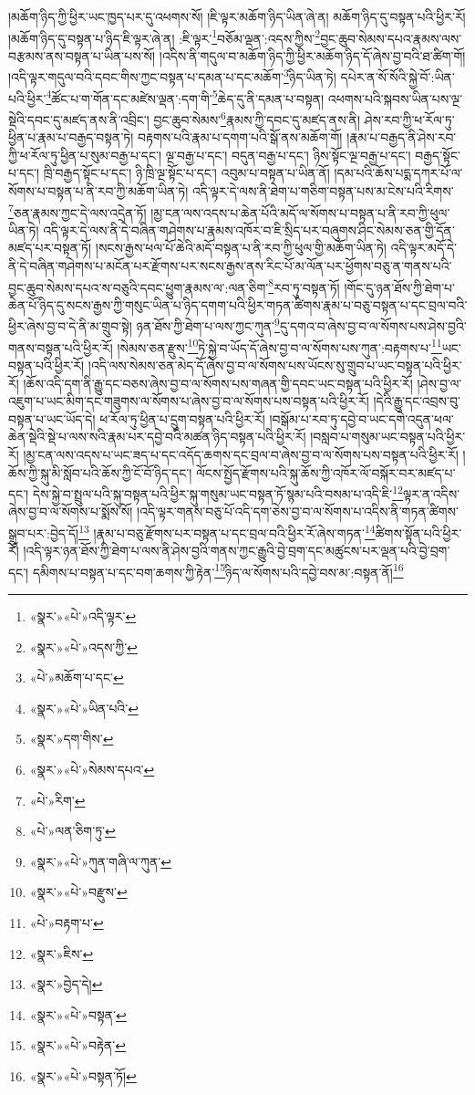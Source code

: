 །མཆོག་ཉིད་ཀྱི་ཕྱིར་ཡང་ཁྱད་པར་དུ་འཕགས་སོ། །ཇི་ལྟར་མཆོག་ཉིད་ཡིན་ཞེ་ན། མཆོག་ཉིད་དུ་བསྟན་པའི་ཕྱིར་རོ། །མཆོག་ཉིད་དུ་བསྟན་པ་ཉིད་ཇི་ལྟར་ཞེ་ན། :ཇི་ལྟར་\footnote{«སྣར་»«པེ་»འདི་ལྟར་}བཅོམ་ལྡན་:འདས་ཀྱིས་\footnote{«སྣར་»«པེ་»འདས་ཀྱི་}བྱང་ཆུབ་སེམས་དཔའ་རྣམས་ལས་བརྩམས་ནས་བསྟན་པ་ཡིན་པས་སོ། །འདིས་ནི་གདུལ་བ་མཆོག་ཉིད་ཀྱི་ཕྱིར་མཆོག་ཉིད་དོ་ཞེས་བྱ་བའི་ཐ་ཚིག་གོ། །འདི་ལྟར་གདུལ་བའི་དབང་གིས་ཀྱང་བསྟན་པ་དམན་པ་དང་མཆོག་\footnote{«པེ་»མཆོག་པ་དང་}ཉིད་ཡིན་ཏེ། དཔེར་ན་སོ་སོའི་སྐྱེ་བོ་:ཡིན་པའི་ཕྱིར་\footnote{«སྣར་»«པེ་»ཡིན་པའི་}ཚོང་པ་ག་གོན་དང་མཛེས་ལྡན་:དག་གི་\footnote{«སྣར་»དག་གིས་}ཆེད་དུ་ནི་དམན་པ་བསྟན། འཕགས་པའི་སྐབས་ཡིན་པས་ལྔ་སྡེའི་དབང་དུ་མཛད་ནས་ནི་འབྲིང་། བྱང་ཆུབ་སེམས་\footnote{«སྣར་»«པེ་»སེམས་དཔའ་}རྣམས་ཀྱི་དབང་དུ་མཛད་ནས་ནི། ཤེས་རབ་ཀྱི་ཕ་རོལ་ཏུ་ཕྱིན་པ་རྣམ་པ་བརྒྱད་བསྟན་ཏེ། བརྟགས་པའི་རྣམ་པ་དགག་པའི་སྒོ་ནས་མཆོག་གོ། །རྣམ་པ་བརྒྱད་ནི་ཤེས་རབ་ཀྱི་ཕ་རོལ་ཏུ་ཕྱིན་པ་སུམ་བརྒྱ་པ་དང་། ལྔ་བརྒྱ་པ་དང་། བདུན་བརྒྱ་པ་དང་། ཉིས་སྟོང་ལྔ་བརྒྱ་པ་དང་། བརྒྱད་སྟོང་པ་དང་། ཁྲི་བརྒྱད་སྟོང་པ་དང་། ཉི་ཁྲི་ལྔ་སྟོང་པ་དང་། འབུམ་པ་བསྟན་པ་ཡིན་ནོ། །དམ་པའི་ཆོས་པདྨ་དཀར་པོ་ལ་སོགས་པ་བསྟན་པ་ནི་རབ་ཀྱི་མཆོག་ཡིན་ཏེ། འདི་ལྟར་དེ་ལས་ནི་ཐེག་པ་གཅིག་བསྟན་པས་མ་ངེས་པའི་རིགས་\footnote{«པེ་»རིག་}ཅན་རྣམས་ཀྱང་དེ་ལས་འདྲེན་ཏོ། །མྱ་ངན་ལས་འདས་པ་ཆེན་པོའི་མདོ་ལ་སོགས་པ་བསྟན་པ་ནི་རབ་ཀྱི་ཕུལ་ཡིན་ཏེ། འདི་ལྟར་དེ་ལས་ནི་དེ་བཞིན་གཤེགས་པ་རྣམས་འཁོར་བ་ཇི་སྲིད་པར་བཞུགས་ཤིང་སེམས་ཅན་གྱི་དོན་མཛད་པར་བསྟན་ཏོ། །སངས་རྒྱས་ཕལ་པོ་ཆེའི་མདོ་བསྟན་པ་ནི་རབ་ཀྱི་ཕུལ་གྱི་མཆོག་ཡིན་ཏེ། འདི་ལྟར་མདོ་དེ་ནི་དེ་བཞིན་གཤེགས་པ་མངོན་པར་རྫོགས་པར་སངས་རྒྱས་ནས་རིང་པོ་མ་ལོན་པར་ཕྱོགས་བཅུ་ན་གནས་པའི་བྱང་ཆུབ་སེམས་དཔའ་ས་བཅུའི་དབང་ཕྱུག་རྣམས་ལ་:ལན་ཅིག་\footnote{«པེ་»ལན་ཅིག་ཏུ་}རབ་ཏུ་བསྟན་ཏོ། །གོང་དུ་ཉན་ཐོས་ཀྱི་ཐེག་པ་ཆེན་པོ་ཉིད་དུ་སངས་རྒྱས་ཀྱི་གསུང་ཡིན་པ་ཉིད་དགག་པའི་ཕྱིར་གཏན་ཚིགས་རྣམ་པ་བཅུ་བསྟན་པ་དང་བྲལ་བའི་ཕྱིར་ཞེས་བྱ་བ་དེ་ནི་མ་གྲུབ་སྟེ། ཉན་ཐོས་ཀྱི་ཐེག་པ་ལས་ཀྱང་ཀུན་\footnote{«སྣར་»«པེ་»ཀུན་གཞི་ལ་ཀུན་}དུ་དགའ་བ་ཞེས་བྱ་བ་ལ་སོགས་པས་ཤེས་བྱའི་གནས་བསྟན་པའི་ཕྱིར་རོ། །སེམས་ཅན་རྫུས་\footnote{«སྣར་»«པེ་»བརྫུས་}ཏེ་སྐྱེ་བ་ཡོད་དོ་ཞེས་བྱ་བ་ལ་སོགས་པས་ཀུན་:བརྟགས་པ་\footnote{«པེ་»བརྟག་པ་}ཡང་བསྟན་པའི་ཕྱིར་རོ། །འདི་ལས་སེམས་ཅན་མེད་དོ་ཞེས་བྱ་བ་ལ་སོགས་པས་ཡོངས་སུ་གྲུབ་པ་ཡང་བསྟན་པའི་ཕྱིར་རོ། །ཆོས་འདི་དག་ནི་རྒྱུ་དང་བཅས་ཞེས་བྱ་བ་ལ་སོགས་པས་གཞན་གྱི་དབང་ཡང་བསྟན་པའི་ཕྱིར་རོ། །ཤེས་བྱ་ལ་འཇུག་པ་ཡང་མིག་དང་གཟུགས་ལ་སོགས་པ་ཞེས་བྱ་བ་ལ་སོགས་པས་བསྟན་པའི་ཕྱིར་རོ། །དེའི་རྒྱུ་དང་འབྲས་བུ་བསྟན་པ་ཡང་ཡོད་དེ། ཕ་རོལ་ཏུ་ཕྱིན་པ་དྲུག་བསྟན་པའི་ཕྱིར་རོ། །བསྒོམ་པ་རབ་ཏུ་དབྱེ་བ་ཡང་དགེ་འདུན་ཕལ་ཆེན་སྡེའི་སྡེ་པ་ལས་སའི་རྣམ་པར་དབྱེ་བའི་མཚན་ཉིད་བསྟན་པའི་ཕྱིར་རོ། །བསླབ་པ་གསུམ་ཡང་བསྟན་པའི་ཕྱིར་རོ། །མྱ་ངན་ལས་འདས་པ་ཡང་ཟད་པ་དང་འདོད་ཆགས་དང་བྲལ་བ་ཞེས་བྱ་བ་ལ་སོགས་པས་བསྟན་པའི་ཕྱིར་རོ། །ཆོས་ཀྱི་སྐུ་མི་སློབ་པའི་ཆོས་ཀྱི་ངོ་བོ་ཉིད་དང་། ལོངས་སྤྱོད་རྫོགས་པའི་སྐུ་ཆོས་ཀྱི་འཁོར་ལོ་བསྐོར་བར་མཛད་པ་དང་། དེས་སྐྱེ་བ་སྤྲུལ་པའི་སྐུ་བསྟན་པའི་ཕྱིར་སྐུ་གསུམ་ཡང་བསྟན་ཏོ་སྙམ་པའི་བསམ་པ་འདི་ཇི་\footnote{«སྣར་»ཇིས་}ལྟར་ན་འདིས་ཞེས་བྱ་བ་ལ་སོགས་པ་སྨོས་སོ། །འདི་ལྟར་གནས་བཅུ་པོ་འདི་དག་ཅེས་བྱ་བ་ལ་སོགས་པ་འདིས་ནི་གཏན་ཚིགས་སྒྲུབ་པར་:བྱེད་དོ།\footnote{«སྣར་»བྱེད་དེ།} །རྣམ་པ་བཅུ་རྫོགས་པར་བསྟན་པ་དང་བྲལ་བའི་ཕྱིར་རོ་ཞེས་གཏན་\footnote{«སྣར་»«པེ་»བསྟན་}ཚིགས་སྟོན་པའི་ཕྱིར་རོ། །འདི་ལྟར་ཉན་ཐོས་ཀྱི་ཐེག་པ་ལས་ནི་ཤེས་བྱའི་གནས་ཀྱང་རྒྱུའི་བྱེ་བྲག་དང་མཚུངས་པར་ལྡན་པའི་བྱེ་བྲག་དང་། དམིགས་པ་བསྟན་པ་དང་བག་ཆགས་ཀྱི་རྟེན་\footnote{«སྣར་»«པེ་»བརྟེན་}ཉིད་ལ་སོགས་པའི་དབྱེ་བས་མ་:བསྟན་ནོ།\footnote{«སྣར་»«པེ་»བསྟན་ཏོ།} 